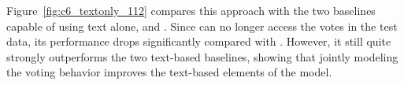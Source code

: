 Figure~\ref{fig:c6_textonly_112} compares this approach with the two
baselines capable of using text alone, \tf{} and \tfidf{}.  Since \name{} can no longer access the votes in
the test data, its performance drops significantly compared with
\vote{}. However, it still quite strongly outperforms the two text-based baselines, showing that jointly modeling the voting behavior improves the text-based elements of the model.

